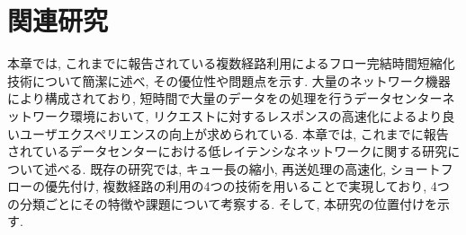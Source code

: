 
\chapter{関連研究}
\label{chapter:related_work}
本章では, これまでに報告されている複数経路利用によるフロー完結時間短縮化技術について簡潔に述べ, その優位性や問題点を示す.
大量のネットワーク機器により構成されており, 短時間で大量のデータをの処理を行うデータセンターネットワーク環境において,
リクエストに対するレスポンスの高速化によるより良いユーザエクスペリエンスの向上が求められている. 
本章では, これまでに報告されているデータセンターにおける低レイテンシなネットワークに関する研究について述べる. 
既存の研究では, キュー長の縮小, 再送処理の高速化, ショートフローの優先付け, 複数経路の利用の4つの技術を用いることで実現しており,
4つの分類ごとにその特徴や課題について考察する. 
そして, 本研究の位置付けを示す. 




